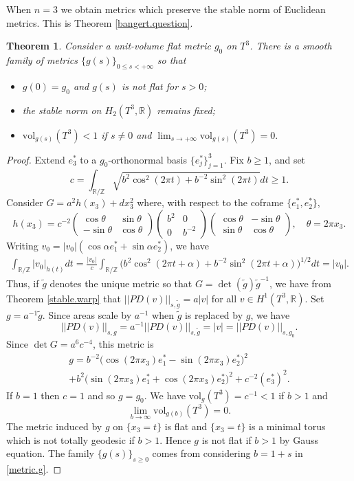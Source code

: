 \documentclass[11pt]{amsart}
\def\R{\mathbb R}
\def\Z{\mathbb Z}
\def\vol{\mathrm{vol}}
\newtheorem{thm}{Theorem}[section]
\theoremstyle{remark}
\theoremstyle{definition}
\begin{document}
	
	When $n=3$ we obtain metrics which preserve the stable norm of Euclidean metrics. This is Theorem \ref{bangert.question}.
	{\begin{thm}\label{n=3.example} Consider a unit-volume flat metric $g_0$ on $T^3$. There is a smooth family of metrics $\{{g}(s)\}_{0\leq s<+\infty}$ so that
			\begin{itemize}
				\item ${g}(0)=g_0$ and  ${g}(s)$ is  not flat for $s>0$;
				\item the stable norm on $H_2(T^3,\R)$ remains fixed;
				\item  $\vol_{{g}(s)}(T^3)<1$ if $s\neq 0$ and $\lim_{s\to +\infty}\vol_{{g}(s)}(T^3)=0.$
			\end{itemize} 
	\end{thm}}
	
	\begin{proof}
		Extend $e_3^*$ to a $g_0$-orthonormal basis $\{e_j^*\}_{j=1}^3$. Fix $b\geq 1$, and set
		$$c=\int_{\R/\Z}\sqrt{b^2\cos^2(2\pi t)+b^{-2}\sin^2(2\pi t)}dt\geq 1.$$
		Consider $G=a^2h(x_3)+dx_3^2$ where, with respect to the coframe $\{e_1^*,e_2^*\}$, 
		$$
		h(x_3)=c^{-2}
		\begin{pmatrix}
			\cos\theta&\sin\theta\\
			-\sin\theta&\cos\theta
		\end{pmatrix}
		\begin{pmatrix}
			b^2&0\\
			0&b^{-2}
		\end{pmatrix}
		\begin{pmatrix}
			\cos\theta&-\sin\theta\\
			\sin\theta&\cos\theta
		\end{pmatrix},\quad \theta=2\pi x_3.
		$$		
		Writing $v_0=|v_0|(\cos\alpha e_1^*+\sin\alpha e_2^*)$, we have
		\begin{multline*}
			\int_{\R/\Z}|v_0|_{h(t)}dt=\frac{|v_0|}{c}\int_{\R/\Z}\big(b^2\cos^2(2\pi t+\alpha)+b^{-2}\sin^2(2\pi t+\alpha)\big)^{1/2}dt
			=|v_0|.
		\end{multline*}
		Thus, if $\widetilde g$ denotes the unique metric so that $G=\det(\widetilde g)\widetilde g^{-1}$, we have from Theorem \ref{stable.warp} that $||PD(v)||_{s,\widetilde g}=a|v|$ for all $v\in H^1(T^3,\R)$. Set $g=a^{-1}\widetilde g$. Since areas scale by $a^{-1}$ when $\widetilde g$ is replaced by $g$, we have
		$$||PD(v)||_{s,g}=a^{-1}||PD(v)||_{s,\widetilde g}=|v|=||PD(v)||_{s,g_0}.$$
		Since $\det G=a^6c^{-4}$, this metric is
		\begin{multline}\label{metric.g}
			g=b^{-2}\big(\cos(2\pi x_3)e_1^*-\sin(2\pi x_3)e_2^*\big)^2\\
			+b^2\big(\sin(2\pi x_3)e_1^*+\cos(2\pi x_3)e_2^*\big)^2+c^{-2}(e_3^*)^2.
		\end{multline}
		If $b=1$ then $c=1$ and so $g=g_0$. We have $\vol_{g}(T^3)=c^{-1}<1$ if $b>1$ and 
		$$\lim_{b\to\infty}\vol_{g(b)}(T^3)=0.$$
		The metric induced by ${g}$ on $\{x_3=t\}$ is flat and $\{x_3=t\}$ is a minimal torus which is not totally geodesic if $b>1$.  Hence ${g}$ is not flat if $b>1$ by Gauss equation.  The family $\{{g}(s)\}_{s\geq 0}$ comes from considering $b=1+s$ in \eqref{metric.g}.
	\end{proof}
	
\end{document}
